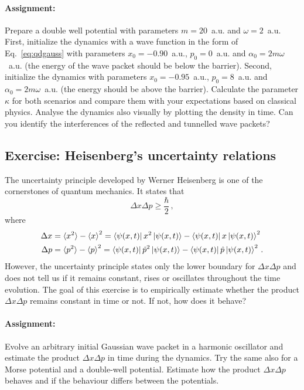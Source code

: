 \paragraph{Assignment:} Prepare a double well potential with parameters $m=20$~a.u. and $\omega=2$~a.u. First, initialize the dynamics with a wave function in the form of Eq.~\eqref{eq:qdgauss} with parameters $x_0=-0.90$~a.u., $p_0=0$~a.u. and $\alpha_0 = 2m\omega$~a.u. (the energy of the wave packet should be below the barrier). Second, initialize the dynamics with parameters $x_0=-0.95$~a.u., $p_0=8$~a.u. and $\alpha_0=2m\omega$~a.u. (the energy should be above the barrier). Calculate the parameter $\kappa$ for both scenarios and compare them with your expectations based on classical physics. Analyse the dynamics also visually by plotting the density in time. Can you identify the interferences of the reflected and tunnelled wave packets?

\subsection*{Exercise: Heisenberg's uncertainty relations}

The uncertainty principle developed by Werner Heisenberg is one of the cornerstones of quantum mechanics. It states that
\begin{equation*}
    \Delta x \Delta p \ge \frac{\hbar}{2} \, , 
\end{equation*}
where
\begin{align*}
    \Delta x &= \braket{x^2} - \braket{x}^2 = \bra{\psi(x, t)}x^2\ket{\psi(x,t)} -  \bra{\psi(x, t)}x\ket{\psi(x,t)}^2\\
    \Delta p &= \braket{p^2} - \braket{p}^2 = \bra{\psi(x, t)}\hat{p}^2\ket{\psi(x,t)} -  \bra{\psi(x, t)}\hat{p}\ket{\psi(x,t)}^2 \, .
\end{align*}
However, the uncertainty principle states only the lower boundary for $\Delta x \Delta p$ and does not tell us if it remains constant, rises or oscillates throughout the time evolution. The goal of this exercise is to empirically estimate whether the product $ \Delta x \Delta p$ remains constant in time or not. If not, how does it behave?

\paragraph{Assignment:} Evolve an arbitrary initial Gaussian wave packet in a harmonic oscillator and estimate the product $\Delta x \Delta p$ in time during the dynamics. Try the same also for a Morse potential and a double-well potential. Estimate how the product $\Delta x \Delta p$ behaves and if the behaviour differs between the potentials.